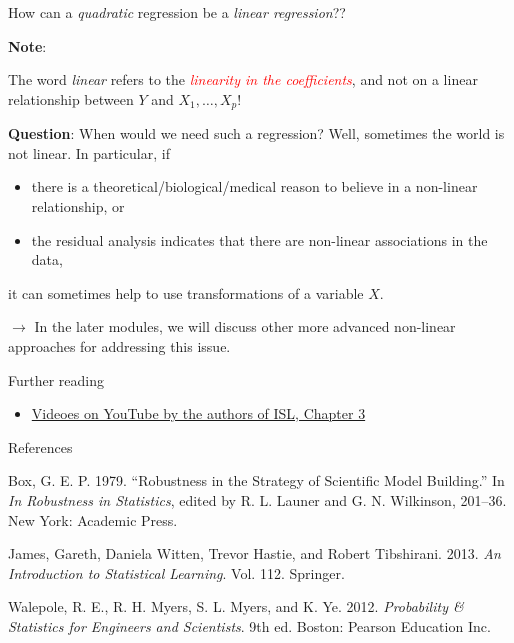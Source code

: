 \documentclass[10pt,ignorenonframetext,]{beamer}
\providecommand{\tightlist}{%
  \setlength{\itemsep}{0pt}\setlength{\parskip}{0pt}}
\begin{document}
\begin{frame}

How can a \emph{quadratic} regression be a \emph{linear regression}??

\vspace{4mm}

\textbf{Note}:

The word \emph{linear} refers to the
\emph{\textcolor{red}{linearity in the coefficients}}, and not on a
linear relationship between \(Y\) and \(X_1, \ldots , X_p\)!

\vspace{4mm}

\textbf{Question}: When would we need such a regression? Well, sometimes
the world is not linear. In particular, if

\begin{itemize}
\tightlist
\item
  there is a theoretical/biological/medical reason to believe in a
  non-linear relationship, or
\item
  the residual analysis indicates that there are non-linear associations
  in the data,
\end{itemize}

it can sometimes help to use transformations of a variable \(X\).

\vspace{2mm}

\scriptsize
\(\rightarrow\) In the later modules, we will discuss other more
advanced non-linear approaches for addressing this issue.

\end{frame}

\begin{frame}{ Further reading }

\begin{itemize}
\tightlist
\item
  \href{https://www.youtube.com/playlist?list=PL5-da3qGB5IBSSCPANhTgrw82ws7w_or9}{Videoes
  on YouTube by the authors of ISL, Chapter 3}
\end{itemize}

\end{frame}

\begin{frame}{References}

\hypertarget{refs}{}
\hypertarget{ref-box1979}{}
Box, G. E. P. 1979. ``Robustness in the Strategy of Scientific Model
Building.'' In \emph{In Robustness in Statistics}, edited by R. L.
Launer and G. N. Wilkinson, 201--36. New York: Academic Press.

\hypertarget{ref-ISL}{}
James, Gareth, Daniela Witten, Trevor Hastie, and Robert Tibshirani.
2013. \emph{An Introduction to Statistical Learning}. Vol. 112.
Springer.

\hypertarget{ref-walepole.etal}{}
Walepole, R. E., R. H. Myers, S. L. Myers, and K. Ye. 2012.
\emph{Probability \& Statistics for Engineers and Scientists}. 9th ed.
Boston: Pearson Education Inc.

\end{frame}
\end{document}
